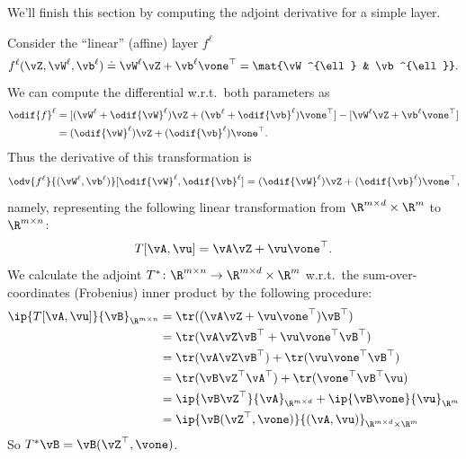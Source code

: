 \documentclass[../../book-main.tex]{subfiles}
\begin{document}
We'll finish this section by computing the adjoint derivative for a
simple layer.
\begin{example}
    Consider the ``linear'' (affine) layer \(f^{\ell}\)
    \begin{equation}
        f^{\ell}(\vZ, \vW^{\ell}, \vb^{\ell}) \doteq \vW^{\ell}\vZ +
        \vb^{\ell}\vone^{\top} = \mat{\vW^{\ell} & \vb^{\ell}}.
    \end{equation}
    We can compute the differential w.r.t.~both parameters as
    \begin{align}
        \odif{f}^{\ell}
        &= [(\vW^{\ell} + \odif{\vW}^{\ell})\vZ + (\vb^{\ell} +
        \odif{\vb}^{\ell})\vone^{\top}] - [\vW^{\ell}\vZ + \vb^{\ell}\vone^{\top}] \\
        &= (\odif{\vW}^{\ell})\vZ + (\odif{\vb}^{\ell})\vone^{\top}.
    \end{align}
    Thus the derivative of this transformation is
    \begin{equation}
        \odv{f^{\ell}}{(\vW^{\ell}, \vb^{\ell})}[\odif{\vW}^{\ell},
        \odif{\vb}^{\ell}] = (\odif{\vW}^{\ell})\vZ +
        (\odif{\vb}^{\ell})\vone^{\top},
    \end{equation}
    namely, representing the following linear transformation from
    \(\R^{m \times d} \times \R^{m}\) to \(\R^{m \times n}\):
    \begin{equation}
        T[\vA, \vu] = \vA\vZ + \vu\vone^{\top}.
    \end{equation}
    We calculate the adjoint \(T^{*} \colon \R^{m \times n} \to \R^{m
    \times d} \times \R^{m}\) w.r.t.~the sum-over-coordinates
    (Frobenius) inner product by the following procedure:
    \begin{align}
        \ip{T[\vA, \vu]}{\vB}_{\R^{m \times n}}
        &= \tr((\vA\vZ + \vu\vone^{\top})\vB^{\top}) \\
        &= \tr(\vA\vZ\vB^{\top} + \vu\vone^{\top}\vB^{\top}) \\
        &= \tr(\vA\vZ\vB^{\top}) + \tr(\vu\vone^{\top}\vB^{\top}) \\
        &= \tr(\vB\vZ^{\top}\vA^{\top}) + \tr(\vone^{\top}\vB^{\top}\vu) \\
        &= \ip{\vB\vZ^{\top}}{\vA}_{\R^{m \times d}} +
        \ip{\vB\vone}{\vu}_{\R^{m}} \\
        &= \ip{\vB(\vZ^{\top}, \vone)}{(\vA, \vu)}_{\R^{m \times d}
        \times \R^{m}}
    \end{align}
    So \(T^{*}\vB = \vB(\vZ^{\top}, \vone)\).
\end{example}
\end{document}
